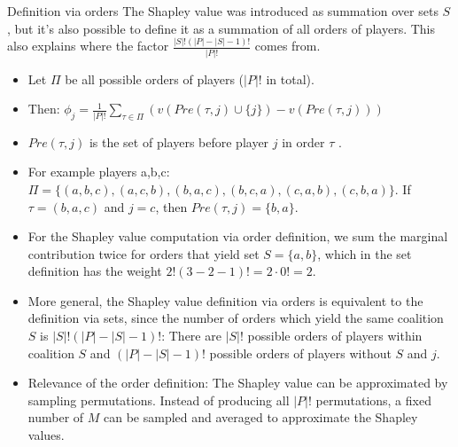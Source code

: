 \documentclass[11pt,compress,t,notes=noshow, xcolor=table]{beamer}
\begin{document}
\begin{vbframe}{Definition via orders}
The Shapley value was introduced as summation over sets $S$, but it's also possible to define it as a summation of all orders of players.
This also explains where the factor $\frac{|S|!(|P| - |S| - 1)!}{|P|!}$ comes from.
\begin{itemize}
  \item Let $\Pi$ be all possible orders of players ($|P|!$ in total).
  \item Then: $\phi_j = \frac{1}{|P|!} \sum_{\tau \in \Pi} (v(Pre(\tau,j) \cup \{j\}) - v(Pre(\tau,j)))$
  \item $Pre(\tau,j)$ is the set of players before player $j$ in order $\tau$ .
  \item For example players a,b,c: $\Pi = \{(a,b,c), (a,c,b), (b,a,c), (b,c,a), (c,a,b), (c,b,a)\}$. If $\tau = (b,a,c)$ and $j=c$, then $Pre(\tau,j) = \{b, a\}$.
  \item For the Shapley value computation via order definition, we sum the marginal contribution twice for orders that yield set $S = \{a,b\}$, which in the set definition has the weight $2! (3 - 2 - 1)! = 2 \cdot 0! = 2$.
  \item More general, the Shapley value definition via orders is equivalent to the definition via sets, since the number of orders which yield the same coalition $S$ is  $|S|!(|P| - |S| - 1)!$: There are $|S|!$ possible orders of players within coalition $S$ and $(|P| - |S| - 1)!$ possible orders of players without $S$ and $j$.
  \item Relevance of the order definition: The Shapley value can be approximated by sampling permutations. Instead of producing all $|P|!$ permutations, a fixed number of $M$ can be sampled and averaged to approximate the Shapley values.
\end{itemize}

\end{vbframe}
\end{document}
